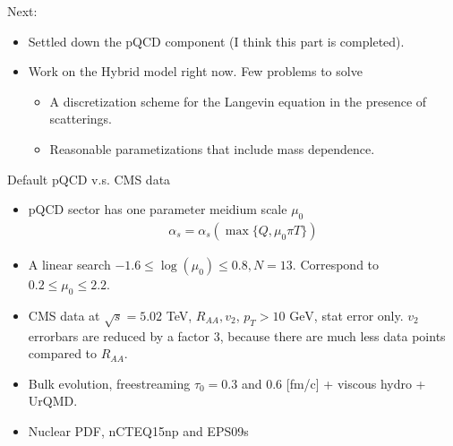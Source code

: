 \documentclass[11pt]{beamer}
\begin{document}
\begin{frame}{Next:}
\begin{itemize}
\item Settled down the pQCD component (I think this part is completed).
\item Work on the Hybrid model right now. Few problems to solve
\begin{itemize}
\item A discretization scheme for the Langevin equation in the presence of scatterings.
\item Reasonable parametizations that include mass dependence.
\end{itemize}
\end{itemize}

\end{frame}

\begin{frame}{Default pQCD v.s. CMS data}
\begin{itemize}
\item pQCD sector has one parameter meidium scale $\mu_0$
\begin{eqnarray}
\nonumber
\alpha_s = \alpha_s(\max\{Q, \mu_0 \pi T \})
\end{eqnarray}
\item A linear search $-1.6 \leq \log(\mu_0) \leq 0.8, N=13$. Correspond to $0.2 \leq \mu_0 \leq 2.2$.
\item CMS data at $\sqrt{s} = 5.02$ TeV, $R_{AA}, v_{2}$, $p_T > 10 \textrm{ GeV}$, stat error only. $v_2$ errorbars are reduced by a factor $3$, because there are much less data points compared to $R_{AA}$.
\item Bulk evolution, freestreaming $\tau_0 = 0.3$ and $0.6$ [fm/c] + viscous hydro + UrQMD.
\item Nuclear PDF, nCTEQ15np and EPS09s
\end{itemize}
\end{frame}
\end{document}
